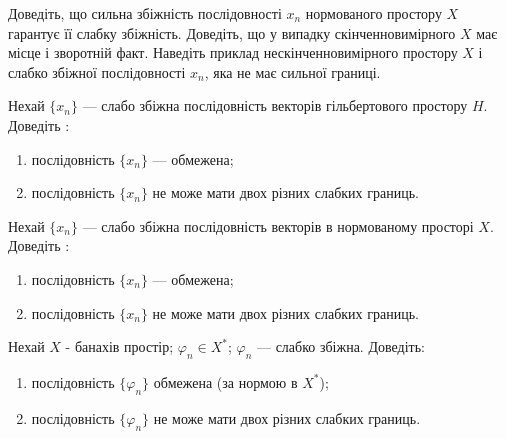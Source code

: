 \begin{exercise}
    Доведіть, що сильна збіжність послідовності $x_n$ нормованого простору $X$ гарантує 
    її слабку збіжність. Доведіть, що у випадку скінченновимірного $X$ має місце і зворотній 
    факт. Наведіть приклад нескінченновимірного простору $X$ і слабко збіжної послідовності 
    $x_n$, яка не має сильної границі.
\end{exercise}

\begin{exercise}
    Нехай $\{x_n\}$ --- слабо збіжна послідовність векторів гільбертового простору $H$. 
    Доведіть : 
    \begin{enumerate}[label=\ukr*)]
        \item послідовність $\{x_n\}$ --- обмежена;
        \item послідовність $\{x_n\}$ не може мати двох різних слабких 
        границь.
    \end{enumerate}
\end{exercise}

\begin{exercise}
    Нехай $\{x_n\}$ --- слабо збіжна послідовність векторів в нормованому 
    просторі $X$. Доведіть :
    \begin{enumerate}[label=\ukr*)]
        \item послідовність $\{x_n\}$ --- обмежена;
        \item послідовність $\{x_n\}$ не може мати двох різних 
        слабких границь.
    \end{enumerate}
\end{exercise}

\begin{exercise}
    Нехай $X$ - банахів простір; $\varphi_n \in X^*$; $\varphi_n$ --- 
    слабко збіжна. Доведіть:
    \begin{enumerate}[label=\ukr*)]
        \item послідовність $\{\varphi_n\}$ обмежена (за нормою в $X^*$);
        \item послідовність $\{\varphi_n\}$ не може мати двох різних слабких 
        границь.
    \end{enumerate}
\end{exercise}

